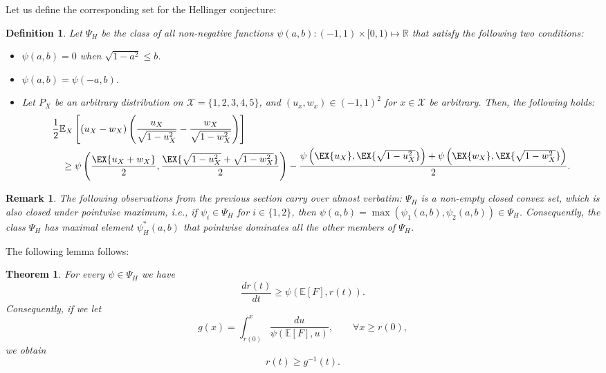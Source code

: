 \documentclass[conference,letterpaper,onecolumn]{IEEEtran}
\theoremstyle{plain}%
\newtheorem{thm}{Theorem}
\newtheorem{definition}{Definition}
\newtheorem{rem}{Remark}
\begin{document}
Let us define the corresponding set for the Hellinger conjecture:
\begin{definition}Let $\Psi_H$ be the class of all non-negative functions $\psi(a,b):(-1,1)\times [0,1)\mapsto \mathbb{R}$ that satisfy the following two conditions:
\begin{itemize}
    \item 
    $\psi(a,b)=0$ when $\sqrt{1-a^2}\leq b$.
    \item $\psi(a,b)=\psi(-a,b)$.
    \item Let $P_X$ be an arbitrary distribution on $\mathcal{X}=\{1,2,3,4,5\}$, and $(u_x,w_x)\in(-1,1)^2$ for $x\in\mathcal{X}$ be arbitrary. Then, the following 
holds:{\begin{align}
\label{psi:constraint2}
        &\frac{1}{2}\mathbb{E}_X\left[(u_X-w_X)\left(\frac{u_X}{\sqrt{1-u_X^2}} - \frac{w_X}{\sqrt{1-w_X^2}}\right)\right] \\&\quad\geq \psi\left(\frac{\EX{u_X+w_X}}{2},\frac{\EX{\sqrt{1-u_X^2} + \sqrt{1-w_X^2}}}{2}\right) - \frac{\psi\left(\EX{u_X},\EX{\sqrt{1-u_X^2}}\right) + \psi\left(\EX{w_X},\EX{\sqrt{1-w_X^2}}\right)}{2}.
    \end{align}}
\end{itemize}
  
\end{definition}

\begin{rem}
\label{rem:hel1}
    The following observations from the previous section carry over almost verbatim:
        $\Psi_H$ is a non-empty closed convex set, which is also closed under pointwise maximum, i.e., if $\psi_i\in\Psi_H$ for $i\in\{1,2\}$, then $\psi(a,b)=\max(\psi_1(a,b),\psi_2(a,b))\in\Psi_H$. Consequently, the class $\Psi_H$ has maximal element $\psi_H^*(a,b)$ that pointwise dominates all the other members of $\Psi_H$. %
\end{rem}



The following lemma follows:

\begin{thm}\label{thm2}
For every $\psi\in\Psi_H$ we have  $$\frac{dr(t)}{dt} \geq \psi\left(\mathbb{E}[F],r(t)\right).$$
Consequently, if we let
$$g(x)=\int_{r(0)}^{x}\frac{du}{\psi(\mathbb{E}[F],u)},\qquad \forall x\geq r(0),$$
we obtain
$$r(t)\geq g^{-1}(t).$$
\end{thm}
\end{document}
